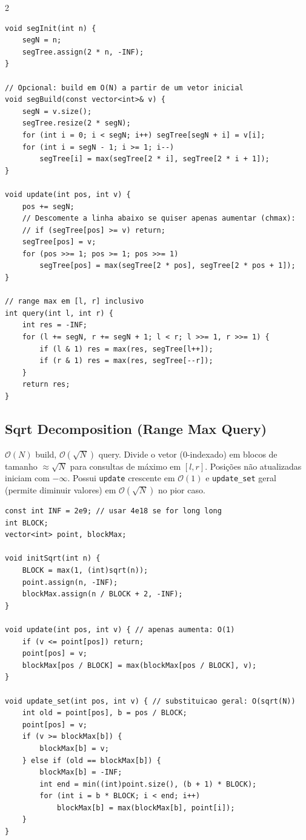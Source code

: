 \documentclass[11pt]{article}
\begin{document}
\begin{multicols}{2}
\begin{lstlisting}
void segInit(int n) {
    segN = n;
    segTree.assign(2 * n, -INF);
}

// Opcional: build em O(N) a partir de um vetor inicial
void segBuild(const vector<int>& v) {
    segN = v.size();
    segTree.resize(2 * segN);
    for (int i = 0; i < segN; i++) segTree[segN + i] = v[i];
    for (int i = segN - 1; i >= 1; i--)
        segTree[i] = max(segTree[2 * i], segTree[2 * i + 1]);
}

void update(int pos, int v) {
    pos += segN;
    // Descomente a linha abaixo se quiser apenas aumentar (chmax):
    // if (segTree[pos] >= v) return;
    segTree[pos] = v;
    for (pos >>= 1; pos >= 1; pos >>= 1)
        segTree[pos] = max(segTree[2 * pos], segTree[2 * pos + 1]);
}

// range max em [l, r] inclusivo
int query(int l, int r) {
    int res = -INF;
    for (l += segN, r += segN + 1; l < r; l >>= 1, r >>= 1) {
        if (l & 1) res = max(res, segTree[l++]);
        if (r & 1) res = max(res, segTree[--r]);
    }
    return res;
}
\end{lstlisting}

\subsection{Sqrt Decomposition (Range Max Query)}
$\mathcal{O}(N)$ build, $\mathcal{O}(\sqrt{N})$ query. Divide o vetor (0-indexado) em blocos de tamanho $\approx \sqrt{N}$ para consultas de máximo em $[l, r]$. Posições não atualizadas iniciam com $-\infty$. Possui \texttt{update} crescente em $\mathcal{O}(1)$ e \texttt{update\_set} geral (permite diminuir valores) em $\mathcal{O}(\sqrt{N})$ no pior caso.
\begin{lstlisting}
const int INF = 2e9; // usar 4e18 se for long long
int BLOCK;
vector<int> point, blockMax;

void initSqrt(int n) {
    BLOCK = max(1, (int)sqrt(n));
    point.assign(n, -INF);
    blockMax.assign(n / BLOCK + 2, -INF);
}

void update(int pos, int v) { // apenas aumenta: O(1)
    if (v <= point[pos]) return;
    point[pos] = v;
    blockMax[pos / BLOCK] = max(blockMax[pos / BLOCK], v);
}

void update_set(int pos, int v) { // substituicao geral: O(sqrt(N))
    int old = point[pos], b = pos / BLOCK;
    point[pos] = v;
    if (v >= blockMax[b]) {
        blockMax[b] = v;
    } else if (old == blockMax[b]) {
        blockMax[b] = -INF;
        int end = min((int)point.size(), (b + 1) * BLOCK);
        for (int i = b * BLOCK; i < end; i++)
            blockMax[b] = max(blockMax[b], point[i]);
    }
}


\end{lstlisting}
\end{multicols}
\end{document}
